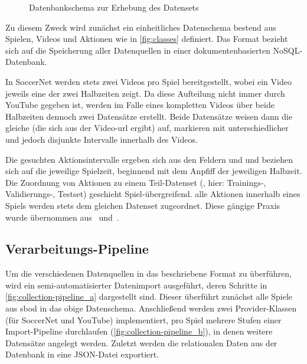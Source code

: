 \begin{figure}
    \centering
    \caption{Datenbankschema zur Erhebung des Datensets}
    \label{fig:classes}
\end{figure}

Zu diesem Zweck wird zunächst ein einheitliches Datenschema bestend aus Spielen, Videos und Aktionen wie in \autoref{fig:classes} definiert.
Das Format bezieht sich auf die Speicherung aller Datenquellen in einer dokumentenbasierten NoSQL-Datenbank.

In SoccerNet werden stets zwei Videos pro Spiel bereitgestellt, wobei ein Video jeweils eine der zwei Halbzeiten zeigt.
Da diese Aufteilung nicht immer durch YouTube gegeben ist, werden im Falle eines kompletten Videos über beide Halbzeiten dennoch zwei Datensätze erstellt.
Beide Datensätze weisen dann die gleiche  (die sich aus der Video-\gls{url} ergibt) auf, markieren mit unterschiedlicher  und  jedoch disjunkte Intervalle innerhalb des Videos.

Die gesuchten Aktionsintervalle ergeben sich aus den Feldern  und  und beziehen sich auf die jeweilige Spielzeit, beginnend mit dem Anpfiff der jeweiligen Halbzeit.
Die Zuordnung von Aktionen zu einem Teil-Datenset (, hier: Trainings-, Validierungs-, Testset) geschieht Spiel-übergreifend.
\Dh alle Aktionen innerhalb eines Spiels werden stets dem gleichen Datenset zugeordnet.
Diese gängige Praxis wurde übernommen aus~\cite{Giancola18} und~\cite{Jiang19}.

\subsection{Verarbeitungs-Pipeline}
\label{subsec:pipeline}

Um die verschiedenen Datenquellen in das beschriebene Format zu überführen, wird ein semi-automatisierter Datenimport ausgeführt, deren Schritte in \autoref{fig:collection-pipeline_a} dargestellt sind.
Dieser überführt zunächst alle Spiele aus \gls{sbod} in das obige Datenschema.
Anschließend werden zwei Provider-Klassen (für SoccerNet und YouTube) implementiert, pro Spiel mehrere Stufen einer Import-Pipeline durchlaufen (\autoref{fig:collection-pipeline_b}), in denen weitere Datensätze angelegt werden.
Zuletzt werden die relationalen Daten aus der Datenbank in eine JSON-Datei exportiert.

